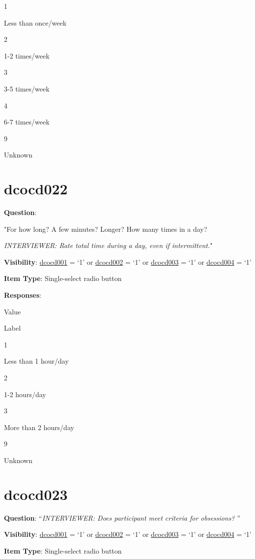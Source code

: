 \documentclass[]{book}
\begin{document}
1

Less than once/week

2

1-2 times/week

3

3-5 times/week

4

6-7 times/week

9

Unknown

\hypertarget{dcocd022}{%
\section{dcocd022}\label{dcocd022}}

\textbf{Question}:

"For how long? A few minutes? Longer? How many times in a day?

\emph{INTERVIEWER: Rate total time during a day, even if intermittent.}"

\textbf{Visibility}: \protect\hyperlink{dcocd001}{dcocd001} = `1' or \protect\hyperlink{dcocd002}{dcocd002} = `1' or \protect\hyperlink{dcocd003}{dcocd003} = `1' or \protect\hyperlink{dcocd004}{dcocd004} = `1'

\textbf{Item Type}: Single-select radio button

\textbf{Responses}:

Value

Label

1

Less than 1 hour/day

2

1-2 hours/day

3

More than 2 hours/day

9

Unknown

\hypertarget{dcocd023}{%
\section{dcocd023}\label{dcocd023}}

\textbf{Question}: ``\emph{INTERVIEWER: Does participant meet criteria for obsessions? }''

\textbf{Visibility}: \protect\hyperlink{dcocd001}{dcocd001} = `1' or \protect\hyperlink{dcocd002}{dcocd002} = `1' or \protect\hyperlink{dcocd003}{dcocd003} = `1' or \protect\hyperlink{dcocd004}{dcocd004} = `1'

\textbf{Item Type}: Single-select radio button
\end{document}
